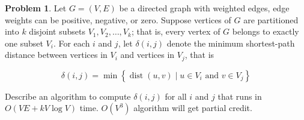 \documentclass{article}
\theoremstyle{definition}
\newtheorem{problem}{Problem}
\begin{document}
\newpage



\begin{problem}
    Let $G=(V, E)$ be a directed graph with weighted edges, edge weights can be positive, negative, or zero. Suppose vertices of $G$ are partitioned into $k$ disjoint subsets $V_1, V_2, \ldots, V_k$; that is, every vertex of $G$ belongs to exactly one subset $V_i$. For each $i$ and $j$, let $\delta(i, j)$ denote the minimum shortest-path distance between vertices in $V_i$ and vertices in $V_j$, that is

$$
\delta(i, j)=\min \left\{\operatorname{dist}(u, v) \mid u \in V_i \text { and } v \in V_j\right\}
$$


Describe an algorithm to compute $\delta(i, j)$ for all $i$ and $j$ that runs in $O(V E+k V \log V)$ time. $O(V^3)$ algorithm will get partial credit.
\end{problem}
\end{document}
